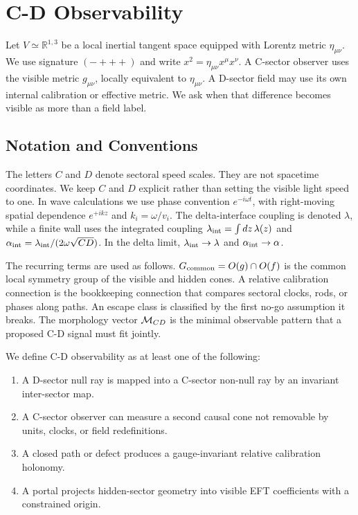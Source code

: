 \documentclass[11pt]{article}
\begin{document}
\section{C-D Observability}


Let \(V\simeq\mathbb{R}^{1,3}\) be a local inertial tangent space equipped with Lorentz metric \(\eta_{\mu\nu}\). We use signature \((-+++)\) and write \(x^2=\eta_{\mu\nu}x^\mu x^\nu\). A C-sector observer uses the visible metric \(g_{\mu\nu}\), locally equivalent to \(\eta_{\mu\nu}\). A D-sector field may use its own internal calibration or effective metric. We ask when that difference becomes visible as more than a field label.


\subsection{Notation and Conventions}


The letters \(C\) and \(D\) denote sectoral speed scales. They are not spacetime coordinates. We keep \(C\) and \(D\) explicit rather than setting the visible light speed to one. In wave calculations we use phase convention \(e^{-i\omega t}\), with right-moving spatial dependence \(e^{+ikz}\) and \(k_i=\omega/v_i\). The delta-interface coupling is denoted \(\lambda\), while a finite wall uses the integrated coupling \(\lambda_{\rm int}=\int dz\,\lambda(z)\) and \(\alpha_{\rm int}=\lambda_{\rm int}/(2\omega\sqrt{CD})\). In the delta limit, \(\lambda_{\rm int}\to\lambda\) and \(\alpha_{\rm int}\to\alpha\).


The recurring terms are used as follows. \(G_{\rm common}=O(g)\cap O(f)\) is the common local symmetry group of the visible and hidden cones. A relative calibration connection is the bookkeeping connection that compares sectoral clocks, rods, or phases along paths. An escape class is classified by the first no-go assumption it breaks. The morphology vector \({\cal M}_{CD}\) is the minimal observable pattern that a proposed C-D signal must fit jointly.


We define C-D observability as at least one of the following:


\begin{enumerate}
\item A D-sector null ray is mapped into a C-sector non-null ray by an invariant inter-sector map.
\item A C-sector observer can measure a second causal cone not removable by units, clocks, or field redefinitions.
\item A closed path or defect produces a gauge-invariant relative calibration holonomy.
\item A portal projects hidden-sector geometry into visible EFT coefficients with a constrained origin.
\end{enumerate}
\end{document}
